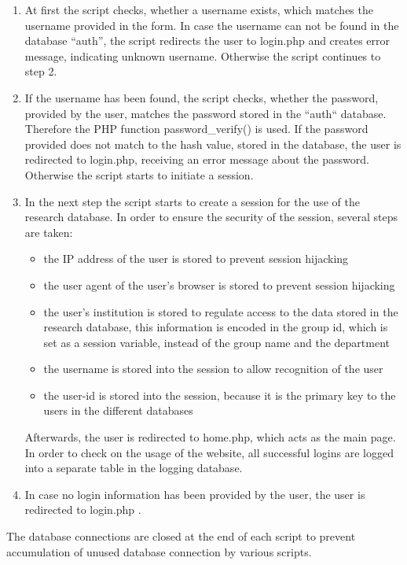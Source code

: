 \begin{enumerate}
 \item At first the script checks, whether a username exists, which matches the username provided in the form. In case the username can not be found in the database ``auth'', the script
 redirects the user to login.php and creates error message, indicating unknown username. Otherwise the script continues to step 2.
 \item If the username has been found, the script checks, whether the password, provided by the user, matches the password stored in the ``auth`` database. Therefore the PHP function 
 password\_verify() is used. If the password provided does not match to the hash value, stored in the database, the user is redirected to login.php, receiving an error message about the 
 password. Otherwise the script starts to initiate a session.
 \item In the next step the script starts to create a session for the use of the research database. In order to ensure the security of the session, several steps are taken:
 \begin{itemize}
  \item the IP address of the user is stored to prevent session hijacking
  \item the user agent of the user's browser is stored to prevent session hijacking
  \item the user's institution is stored to regulate access to the data stored in the research database, this information is encoded in the group id, which is set as a session
  variable, instead of the group name and the department
  \item the username is stored into the session to allow recognition of the user 
  \item the user-id is stored into the session, because it is the primary key to the users in the different databases
 \end{itemize}
  Afterwards, the user is redirected to home.php, which acts as the main page. In order to check on the usage of the website, all successful logins are logged into a separate table in 
  the logging database.
  \item In case no login information has been provided by the user, the user is redirected to login.php .
\end{enumerate}
The database connections are closed at the end of each script to prevent accumulation of unused database connection by various scripts.